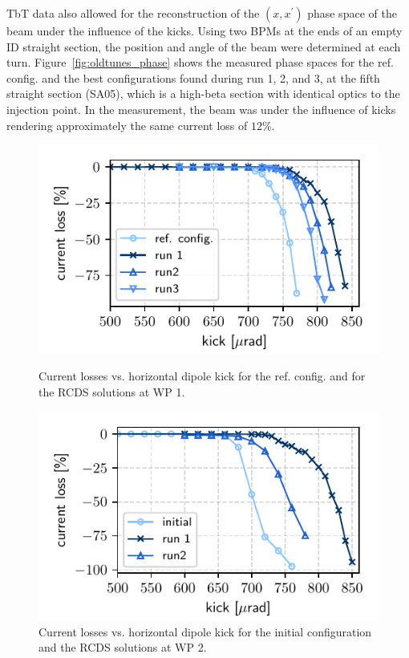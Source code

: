 TbT data also allowed for the reconstruction of the $(x,x^\prime)$ phase space of the beam under the influence of the kicks. Using two BPMs at the ends of an empty ID straight section, the position and angle of the beam were determined at each turn.
Figure~\ref{fig:oldtunes_phase} shows the measured phase spaces for the ref. config. and the best configurations found during run 1, 2, and 3, at the fifth straight section (SA05), which is a high-beta section with identical optics to the injection point. In the measurement, the beam was under the influence of kicks rendering approximately the same current loss of $12\%$.
\begin{figure}[!t]
    \begin{minipage}{0.48\textwidth}
        \includegraphics[width=\textwidth]{Images/WEPL087_f1.pdf}
       \caption{Current losses vs. horizontal dipole kick for the ref. config. and for the RCDS solutions at WP 1.}
       \label{fig:loss_kicks}
    \end{minipage}
    \hfill
    \begin{minipage}{0.48\textwidth}
        \includegraphics[width=\textwidth]{Images/WEPL087_f3.pdf}
        \caption{Current losses vs. horizontal dipole kick for the initial configuration and the RCDS solutions at WP 2.}
        \label{fig:loss_kicks_newtunes}
    \end{minipage}
\end{figure}

